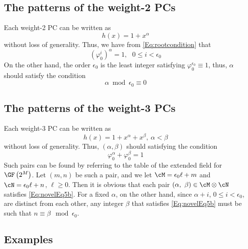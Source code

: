\subsection{The patterns of the weight-2 PCs}
\label{sec:PC2}
Each weight-2 PC can be written as 
\begin{equation}
h(x)=1+x^{\alpha}
\label{eq:wt2-gen-form}
\end{equation}
without loss of generality. Thus, we have from \eqref{Eq:rootcondition} that
\begin{equation}
(\varphi_0^i)^{\alpha} =1,~~~ 0 \leq i < \epsilon_0
\label{novelEq5b}
\end{equation}
On the other hand, the order $\epsilon_0$ is the least integer satisfying $\varphi_0^{\epsilon_0} \equiv 1$, thus, $\alpha$ should satisfy the condition
\begin{equation}
\alpha \bmod \epsilon_0  \equiv 0 
\label{eq:wt2-alpha}
\end{equation}

\subsection{The patterns of the weight-3 PCs}

Each weight-3 PC can be written as 
\begin{equation}
h(x)=1+x^{\alpha}+x^{\beta},~\alpha < \beta
\label{novelEqwt3}
\end{equation}
without loss of generality. 
Thus, $(\alpha,\beta)$ should satisfying the condition
\begin{equation}
\varphi_0^{\alpha}+\varphi_0^{\beta}= 1
\label{Eq:novelEq5b}
\end{equation}
Such pairs can be found by referring to the table of the extended field for $\GF\left(2^M\right)$. 
Let $(m,n)$ be such a pair, and we let $\cM=\epsilon_0 \ell+m$ and $\cN=\epsilon_0 \ell+n$, $\ell \geq 0$. Then it is obvious that each pair $(\alpha,~\beta) \in \cM \otimes \cN$ satisfies
\eqref{Eq:novelEq5b}. For a fixed $\alpha$, on the other hand, since $\alpha+i$, $0 \leq i < \epsilon_0$, are distinct from each other, any integer $\beta$ that satisfies \eqref{Eq:novelEq5b} must be such that $n\equiv \beta \mod \epsilon_0$.

\subsection{Examples}

